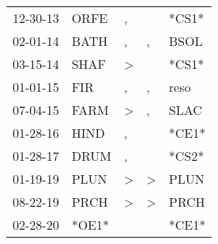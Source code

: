 \begin{supertabular}{lllll}
 12-30-13 &   ORFE &             , &               &  *CS1* \\
 02-01-14 &   BATH &             , &             , &   BSOL \\
 03-15-14 &   SHAF &  \textgreater &               &  *CS1* \\
 01-01-15 &    FIR &             , &             , &   reso \\
 07-04-15 &   FARM &  \textgreater &             , &   SLAC \\
 01-28-16 &   HIND &             , &               &  *CE1* \\
 01-28-17 &   DRUM &             , &               &  *CS2* \\
 01-19-19 &   PLUN &  \textgreater &  \textgreater &   PLUN \\
 08-22-19 &   PRCH &  \textgreater &  \textgreater &   PRCH \\
 02-28-20 &  *OE1* &               &               &  *CE1* \\
\end{supertabular}
